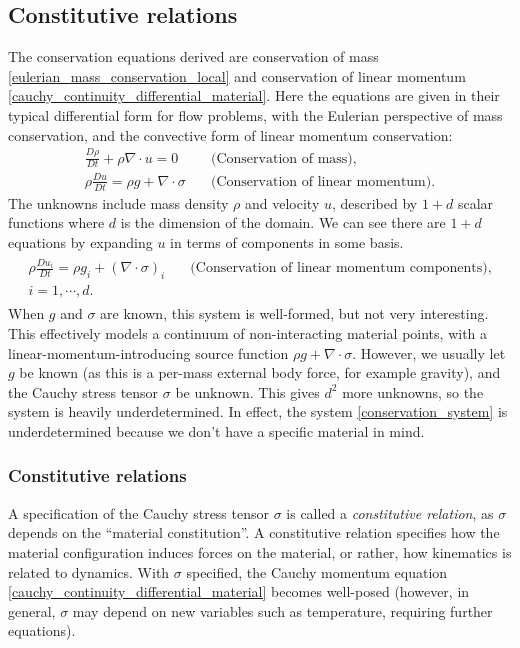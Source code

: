 \subsection{Constitutive relations}\label{constitutive_relations}
The conservation equations derived are conservation of mass \eqref{eulerian_mass_conservation_local} and conservation of linear momentum \eqref{cauchy_continuity_differential_material}.
Here the equations are given in their typical differential form for flow problems, with the Eulerian perspective of mass conservation, and the
convective form of linear momentum conservation:
\begin{equation}\label{conservation_system}
\begin{split}
    \frac{D\rho}{Dt} + \rho\nabla\cdot u = 0 &\quad\text{(Conservation of mass)},
    \\
    \rho\frac{Du}{Dt} = \rho g + \nabla\cdot\sigma &\quad\text{(Conservation of linear momentum)}.
\end{split}
\end{equation}
The unknowns include mass density $\rho$ and velocity $u$, described by $1 + d$ scalar functions where $d$ is the dimension of the domain.
We can see there are $1 + d$ equations by expanding $u$ in terms of components in some basis.
\begin{align*}
\begin{split}
    \rho\frac{Du_i}{Dt} = \rho g_i + \left(\nabla\cdot\sigma\right)_i &\quad\text{(Conservation of linear momentum components)},
    \\
    i=1,\cdots,d. &
\end{split}
\end{align*}
When $g$ and $\sigma$ are known, this system is well-formed, but not very interesting.
This effectively models a continuum of non-interacting material points, with a linear-momentum-introducing source function $\rho g + \nabla\cdot \sigma$.
However, we usually let $g$ be known (as this is a per-mass external body force, for example gravity), and the Cauchy stress tensor $\sigma$ be unknown.
This gives $d^2$ more unknowns, so the system is heavily underdetermined. In effect, the system \eqref{conservation_system} is
underdetermined because we don't have a specific material in mind.

\subsubsection{Constitutive relations}
A specification of the Cauchy stress tensor $\sigma$ is called a \textit{constitutive relation},
as $\sigma$ depends on the ``material constitution''.
A constitutive relation specifies how the material configuration
induces forces on the material, or rather, how kinematics is related to dynamics. With $\sigma$ specified, the Cauchy momentum equation \eqref{cauchy_continuity_differential_material} becomes well-posed
(however, in general, $\sigma$ may depend on new variables such as temperature, requiring further equations).

